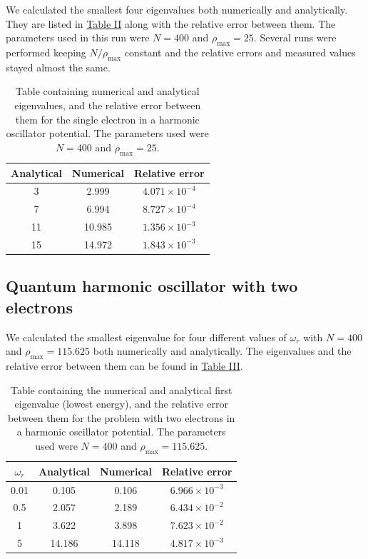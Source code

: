 \documentclass[reprint,english,notitlepage]{revtex4-1}  %
\begin{document}
We calculated the smallest four eigenvalues both numerically and analytically. They are listed in \hyperref[table:IV:b:1]{Table II} along with the relative error between them. The parameters used in this run were $N=400$ and $\rho_\text{max} = 25$. Several runs were performed keeping $N/\rho_\text{max}$ constant and the relative errors and measured values stayed almost the same.

\begin{table}[h!] \label{table:IV:b:1}
\caption{Table containing numerical and analytical eigenvalues, and the relative error between them for the single electron in a harmonic oscillator potential. The parameters used were $N=400$ and $\rho_\text{max} = 25$.}
\begin{tabular}{|c|c|c|}
\hline 
Analytical & Numerical & Relative error \\
\hline
    3     &      2.999   &    $4.071 \times 10^{-4}$ \\
\hline
    7     &      6.994   &    $8.727 \times 10^{-4}$ \\
\hline
   11     &     10.985   &    $1.356 \times 10^{-3}$ \\
\hline
   15     &     14.972   &    $1.843 \times 10^{-3}$ \\
\hline
\end{tabular}
\end{table}


\subsection{Quantum harmonic oscillator with two electrons}\label{sec:IV:c}

We calculated the smallest eigenvalue for four different values of $\omega_r$ with $N=400$ and $\rho_\text{max} = 115.625$ both numerically and analytically. The eigenvalues and the relative error between them can be found in \hyperref[table:IV:c:1]{Table III}. 

\begin{table}[h!] \label{table:IV:c:1}
\caption{Table containing the numerical and analytical first eigenvalue (lowest energy), and the relative error between them for the problem with two electrons in a harmonic oscillator potential. The parameters used were $N=400$ and $\rho_\text{max} = 115.625$.}
\begin{tabular}{|c|c|c|c|}
\hline 
$\omega_r$ & Analytical & Numerical & Relative error \\
\hline
0.01 &    0.105    &      0.106  &    $6.966 \times 10^{-3}$ \\
\hline
0.5 &    2.057     &      2.189   &    $6.434 \times 10^{-2}$ \\
\hline
1 &   3.622     &     3.898   &    $7.623 \times 10^{-2}$ \\
\hline
5 &   14.186     &     14.118   &    $4.817 \times 10^{-3}$ \\
\hline
\end{tabular}
\end{table}
\end{document}
